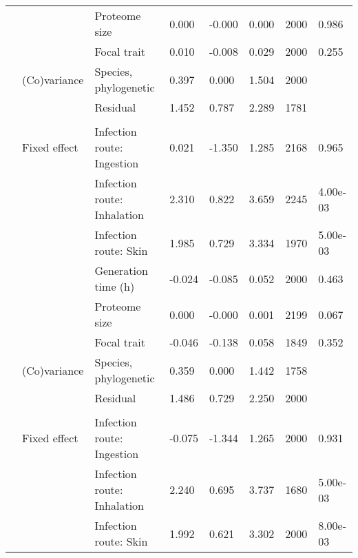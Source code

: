 \begin{table}
\begin{tabular}[t]{llllllll}
\hspace{1em} &  & Proteome size & 0.000 & -0.000 & 0.000 & 2000 & 0.986\\
\hspace{1em} &  & Focal trait & 0.010 & -0.008 & 0.029 & 2000 & 0.255\\
\hspace{1em} & (Co)variance & Species, phylogenetic & 0.397 & 0.000 & 1.504 & 2000 & \\
\hspace{1em} &  & Residual & 1.452 & 0.787 & 2.289 & 1781 & \\
\addlinespace[0.3em]
\multicolumn{8}{l}{\textbf{Antibiotic degradation}}\\
\hspace{1em} & Fixed effect & Infection route: Ingestion & 0.021 & -1.350 & 1.285 & 2168 & 0.965\\
\hspace{1em} &  & Infection route: Inhalation & 2.310 & 0.822 & 3.659 & 2245 & 4.00e-03\\
\hspace{1em} &  & Infection route: Skin & 1.985 & 0.729 & 3.334 & 1970 & 5.00e-03\\
\hspace{1em} &  & Generation time (h) & -0.024 & -0.085 & 0.052 & 2000 & 0.463\\
\hspace{1em} &  & Proteome size & 0.000 & -0.000 & 0.001 & 2199 & 0.067\\
\hspace{1em} &  & Focal trait & -0.046 & -0.138 & 0.058 & 1849 & 0.352\\
\hspace{1em} & (Co)variance & Species, phylogenetic & 0.359 & 0.000 & 1.442 & 1758 & \\
\hspace{1em} &  & Residual & 1.486 & 0.729 & 2.250 & 2000 & \\
\addlinespace[0.3em]
\multicolumn{8}{l}{\textbf{Quorum sensing}}\\
\hspace{1em} & Fixed effect & Infection route: Ingestion & -0.075 & -1.344 & 1.265 & 2000 & 0.931\\
\hspace{1em} &  & Infection route: Inhalation & 2.240 & 0.695 & 3.737 & 1680 & 5.00e-03\\
\hspace{1em} &  & Infection route: Skin & 1.992 & 0.621 & 3.302 & 2000 & 8.00e-03\\

\end{tabular}
\end{table}
